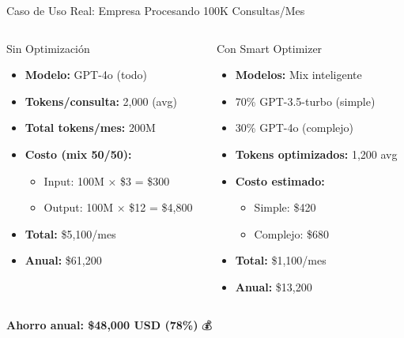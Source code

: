 \documentclass[aspectratio=169,11pt]{beamer}
\begin{document}
\begin{frame}{Caso de Uso Real: Empresa Procesando 100K Consultas/Mes}
\begin{columns}[T]
\begin{column}{0.48\textwidth}
\begin{alertblock}{Sin Optimización}
\begin{itemize}
    \item \textbf{Modelo:} GPT-4o (todo)
    \item \textbf{Tokens/consulta:} 2,000 (avg)
    \item \textbf{Total tokens/mes:} 200M
    \item \textbf{Costo (mix 50/50):}
    \begin{itemize}
        \item Input: 100M × \$3 = \$300
        \item Output: 100M × \$12 = \$4,800
    \end{itemize}
    \item \textbf{Total:} \textcolor{kavakred}{\$5,100/mes}
    \item \textbf{Anual:} \textcolor{kavakred}{\$61,200}
\end{itemize}
\end{alertblock}
\end{column}

\begin{column}{0.48\textwidth}
\begin{exampleblock}{Con Smart Optimizer}
\begin{itemize}
    \item \textbf{Modelos:} Mix inteligente
    \item 70\% GPT-3.5-turbo (simple)
    \item 30\% GPT-4o (complejo)
    \item \textbf{Tokens optimizados:} 1,200 avg
    \item \textbf{Costo estimado:}
    \begin{itemize}
        \item Simple: \$420
        \item Complejo: \$680
    \end{itemize}
    \item \textbf{Total:} \textcolor{kavakgreen}{\$1,100/mes}
    \item \textbf{Anual:} \textcolor{kavakgreen}{\$13,200}
\end{itemize}
\end{exampleblock}
\end{column}
\end{columns}

\vspace{0.5cm}

\begin{center}
\Large \textbf{Ahorro anual: \textcolor{kavakgreen}{\$48,000 USD (78\%)}} 💰
\end{center}
\end{frame}
\end{document}
